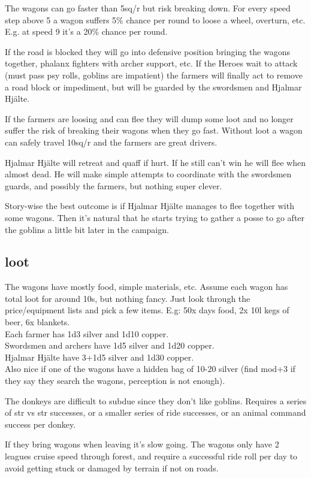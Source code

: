 The wagons can go faster than 5sq/r but risk breaking down. For every speed step above 5 a wagon suffers 5\% chance per round to loose a wheel, overturn, etc. E.g. at speed 9 it's a 20\% chance per round.

If the road is blocked they will go into defensive position bringing the wagons together, phalanx fighters with archer support, etc. If the Heroes wait to attack (must pass psy rolls, goblins are impatient) the farmers will finally act to remove a road block or impediment, but will be guarded by the swordsmen and Hjalmar Hjälte.

If the farmers are loosing and can flee they will dump some loot and no longer suffer the risk of breaking their wagons when they go fast. Without loot a wagon can safely travel 10sq/r and the farmers are great drivers.

Hjalmar Hjälte will retreat and quaff if hurt. If he still can't win he will flee when almost dead. He will make simple attempts to coordinate with the swordsmen guards, and possibly the farmers, but nothing super clever.

Story-wise the best outcome is if Hjalmar Hjälte manages to flee together with some wagons. Then it's natural that he starts trying to gather a posse to go after the goblins a little bit later in the campaign.


\subsection*{loot}

The wagons have mostly food, simple materials, etc. Assume each wagon has total loot for around 10s, but nothing fancy. Just look through the price/equipment lists and pick a few items. E.g: 50x days food, 2x 10l kegs of beer, 6x blankets.\\
Each farmer has 1d3 silver and 1d10 copper.\\
Swordsmen and archers have 1d5 silver and 1d20 copper.\\
Hjalmar Hjälte have 3+1d5 silver and 1d30 copper.\\
Also nice if one of the wagons have a hidden bag of 10-20 silver (find mod+3 if they say they search the wagons, perception is not enough).

The donkeys are difficult to subdue since they don't like goblins. Requires a series of str vs str successes, or a smaller series of ride successes, or an animal command success per donkey. 

If they bring wagons when leaving it's slow going. The wagons only have 2 leagues cruise speed through forest, and require a successful ride roll per day to avoid getting stuck or damaged by terrain if not on roads.

